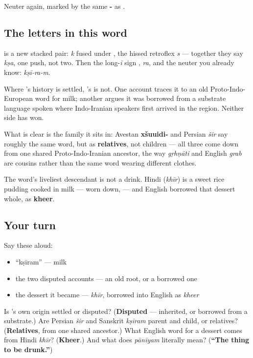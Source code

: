 Neuter again, marked by the same \textbf{-} as \textbf{}.

\subsection*{The letters in this word}
\textbf{} is a new stacked pair: \textbf{} \emph{k} fused under \textbf{}, the hissed retroflex \emph{s} — together they say \emph{kṣa}, one push, not two. Then the long-\emph{ī} sign \textbf{}, \textbf{} \emph{ra}, and the neuter \textbf{} you already know: \emph{kṣī-ra-m}.

\begin{cousinweb}
Where \textbf{}'s history is settled, \textbf{}'s is not. One account traces it to an old Proto-Indo-European word for milk; another argues it was borrowed from a substrate language spoken where Indo-Iranian speakers first arrived in the region. Neither side has won.

What is clear is the family it sits in: Avestan \textbf{xšuuidi-} and Persian \emph{šir} say roughly the same word, but as \textbf{relatives}, not children — all three come down from one shared Proto-Indo-Iranian ancestor, the way \emph{gṛhṇāti} and English \emph{grab} are cousins rather than the same word wearing different clothes.

The word's liveliest descendant is not a drink. Hindi \textbf{} (\emph{khīr}) is a sweet rice pudding cooked in milk — worn down,  — and English borrowed that dessert whole, as \textbf{kheer}.
\end{cousinweb}

\subsection*{Your turn}
Say these aloud:

\begin{itemize}
\raggedright
  \item \textquotedblleft{}kṣīram\textquotedblright{} — milk
  \item the two disputed accounts — an old root, or a borrowed one
  \item the dessert it became — \emph{khīr}, borrowed into English as \emph{kheer}
\end{itemize}

\begin{tcolorbox}[breakable,colback=teal!4,colframe=teal!35!black,title={Before you move on}]
Is 's own origin settled or disputed? (\textbf{Disputed} — inherited, or borrowed from a substrate.) Are Persian \emph{šir} and Sanskrit \emph{kṣīram} parent and child, or relatives? (\textbf{Relatives}, from one shared ancestor.) What English word for a dessert comes from Hindi \emph{khīr}? (\textbf{Kheer}.) And what does \emph{pānīyam} literally mean? (\textbf{\textquotedblleft{}The thing to be drunk.\textquotedblright{}})
\end{tcolorbox}
